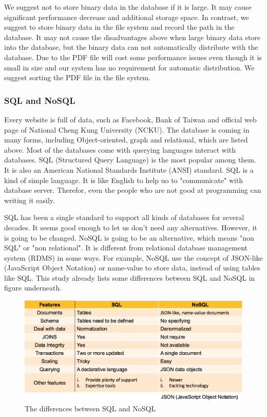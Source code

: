 \begin{enumerate}
    We suggest not to store binary data in the database if it is large.
    It may cause significant performance decrease and additional storage space.
    In contrast, we suggest to store binary data in the file system and record the path in the database. 
    It may not cause the disadvantages above when large binary data store into the database, but the binary data can not automatically distribute with the database.
    Due to the PDF file will cost some performance issues even though it is small in size and our system has no requirement for automatic distribution.
    We suggest sorting the PDF file in the file system.
	
\end{enumerate}


\subsubsection{SQL and NoSQL}
Every website is full of data, such as Facebook, Bank of Taiwan and official web page of National Cheng Kung University (NCKU).
The database is coming in many forms, including Object-oriented, graph and relational, which are listed above.
Most of the databases come with querying languages interact with databases.
SQL (Structured Query Language) is the most popular among them. 
It is also an American National Standards Institute (ANSI) standard.
SQL is a kind of simple language.
It is like English to help uo to "communicate" with database server.
Therefor, even the people who are not good at programming can writing it easily.

SQL has been a single standard to support all kinds of databases for several decades.
It seems good enough to let us don't need any alternatives.
However, it is going to be changed.
NoSQL is going to be an alternative, which means "non SQL" or "non relational". 
It is different from relational database management system (RDMS) in some ways.
For example, NoSQL use the concept of JSON-like (JavaScript Object Notation) or name-value to store data, instead of using tables like SQL. This study already lists some differences between SQL and NoSQL in figure underneath.

\begin{figure}[tbh]
	\begin{center}
		\includegraphics[width=\columnwidth]{Wolverine_Method_Chart_3}
	\end{center}
	\caption{The differences between SQL and NoSQL}
\end{figure}


